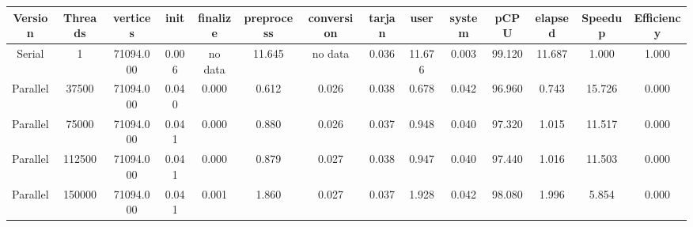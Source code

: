 \begin{tabular}{|c|c|c|c|c|c|c|c|c|c|c|c|c|c|}
\toprule
 Version &  Threads &   vertices &  init & finalize &  preprocess & conversion &  tarjan &   user &  system &   pCPU &  elapsed &  Speedup &  Efficiency \\
\midrule
  Serial &        1 &  71094.000 & 0.006 &  no data &      11.645 &    no data &   0.036 & 11.676 &   0.003 & 99.120 &   11.687 &    1.000 &       1.000 \\
Parallel &    37500 &  71094.000 & 0.040 &    0.000 &       0.612 &      0.026 &   0.038 &  0.678 &   0.042 & 96.960 &    0.743 &   15.726 &       0.000 \\
Parallel &    75000 &  71094.000 & 0.041 &    0.000 &       0.880 &      0.026 &   0.037 &  0.948 &   0.040 & 97.320 &    1.015 &   11.517 &       0.000 \\
Parallel &   112500 &  71094.000 & 0.041 &    0.000 &       0.879 &      0.027 &   0.038 &  0.947 &   0.040 & 97.440 &    1.016 &   11.503 &       0.000 \\
Parallel &   150000 &  71094.000 & 0.041 &    0.001 &       1.860 &      0.027 &   0.037 &  1.928 &   0.042 & 98.080 &    1.996 &    5.854 &       0.000 \\
\bottomrule
\end{tabular}
